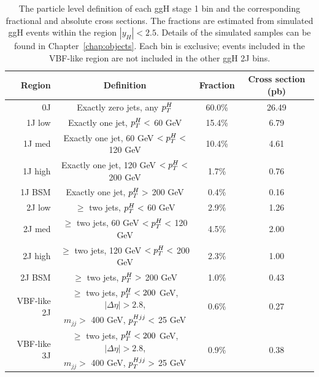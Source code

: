 \begin{table}
  \begin{centering}
    \begin{tabular}{ r | c | c | c } 
    \hline
    Region & Definition & Fraction & Cross section (pb) \\ 
    \hline
    0J          & Exactly zero jets, any $p_T^H$               & 60.0\% & 26.49 \\ 
    \hline
    1J low      & Exactly one jet, $p_T^H <$ 60 GeV            & 15.4\% & 6.79  \\
    \hline
    1J med      & Exactly one jet, 60 GeV $< p_T^H <$ 120 GeV  & 10.4\% & 4.61  \\ 
    \hline
    1J high     & Exactly one jet, 120 GeV $< p_T^H <$ 200 GeV & 1.7\% & 0.76   \\
    \hline
    1J BSM      & Exactly one jet, $p_T^H >$ 200 GeV           & 0.4\% & 0.16   \\ 
    \hline
    2J low      & $\ge$ two jets, $p_T^H <$ 60 GeV             & 2.9\% & 1.26   \\
    \hline
    2J med      & $\ge$ two jets, 60 GeV $< p_T^H <$ 120 GeV   & 4.5\% & 2.00   \\ 
    \hline
    2J high     & $\ge$ two jets, 120 GeV $< p_T^H <$ 200 GeV  & 2.3\% & 1.00   \\
    \hline
    2J BSM      & $\ge$ two jets, $p_T^H >$ 200 GeV            & 1.0\% & 0.43   \\ 
    \hline
    \multirow{2}{*}{VBF-like 2J} & $\ge$ two jets, $p_T^H < 200$ GeV, $|\Delta\eta| > 2.8$, & \multirow{2}{*}{0.6\%} & \multirow{2}{*}{0.27} \\ 
                                 & $m_{jj} >$ 400 GeV, $p_T^{Hjj} <$ 25 GeV &                        &                       \\ 
    \hline
    \multirow{2}{*}{VBF-like 3J} & $\ge$ two jets, $p_T^H < 200$ GeV, $|\Delta\eta| > 2.8$, & \multirow{2}{*}{0.9\%} & \multirow{2}{*}{0.38} \\ 
                                 & $m_{jj} >$ 400 GeV, $p_T^{Hjj} >$ 25 GeV &                        &                       \\ 
    \hline
    \end{tabular}
    \caption{The particle level definition of each ggH stage 1 bin 
    and the corresponding fractional and absolute cross sections.
    The fractions are estimated from simulated ggH \Hgg events 
    within the region $|y_H| < 2.5$.
    Details of the simulated samples can be found in Chapter~\ref{chap:objects}.
    Each bin is exclusive; 
    events included in the VBF-like region are not included in the other ggH 2J bins.
    }
    \label{tab:ggHfractions}
  \end{centering}
\end{table}

